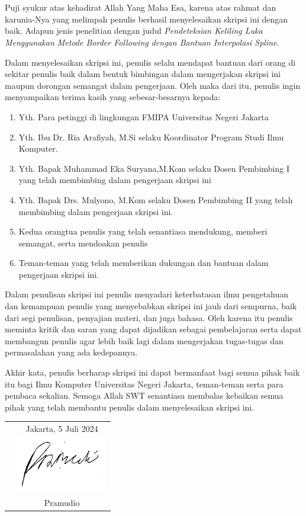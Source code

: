 \chapter*{}

Puji syukur atas kehadirat Allah Yang Maha Esa,
karena atas rahmat dan karunia-Nya yang melimpah 
penulis berhasil menyelesaikan 
skripsi ini dengan baik. Adapun jenis 
penelitian dengan judul 
\textit{Pendeteksian Keliling Luka Menggunakan Metode 
Border Following dengan Bantuan Interpolasi Spline}.

Dalam menyelesaikan skripsi ini, penulis selalu mendapat bantuan dari orang 
di sekitar penulis baik dalam bentuk bimbingan dalam mengerjakan skripsi 
ini maupun dorongan semangat dalam pengerjaan. Oleh maka dari itu, penulis 
ingin menyampaikan terima kasih yang sebesar-besarnya kepada:

\begin{enumerate}

	\item{Yth. Para petinggi di lingkungan FMIPA Universitas Negeri Jakarta}
	\item{Yth. Ibu Dr. Ria Arafiyah, M.Si selaku Koordinator Program Studi Ilmu
		Komputer.}
	\item{Yth. Bapak Muhammad Eka Suryana,M.Kom selaku Dosen Pembimbing I 
		yang telah membimbing dalam pengerjaan skripsi ini}
	\item{Yth. Bapak Drs. Mulyono, M.Kom selaku Dosen Pembimbing II yang telah
		membimbing dalam pengerjaan skripsi ini.}
	\item{Kedua orangtua penulis yang telah senantiasa mendukung,
	memberi semangat, serta mendoakan penulis}
	\item{Teman-teman yang telah memberikan dukungan dan bantuan dalam 
		pengerjaan skripsi ini.}
	
\end{enumerate}

Dalam penulisan skripsi ini penulis menyadari keterbatasan ilmu 
pengetahuan dan kemampuan penulis yang menyebabkan skripsi ini jauh dari 
sempurna, baik dari segi penulisan, penyajian materi, dan juga bahasa. Oleh 
karena itu penulis meminta kritik dan saran yang dapat dijadikan sebagai 
pembelajaran serta dapat membangun penulis agar lebih baik lagi dalam mengerjakan 
tugas-tugas dan permasalahan yang ada kedepannya.

Akhir kata, penulis berharap skripsi 
ini dapat bermanfaat bagi semua pihak baik itu 
bagi Ilmu Komputer Universitas Negeri Jakarta, teman-teman
serta para pembaca sekalian. Semoga Allah SWT 
senantiasa membalas kebaikan semua pihak yang 
telah membantu penulis dalam menyelesaikan skripsi ini.
\vspace{4cm}

\begin{tabular}{p{7.5cm}c}
	&Jakarta, 5 Juli 2024\\
	&\includegraphics[keepaspectratio, width = 4cm]{gambar/TTD_Pramudio.png}\\
	&Pramudio
\end{tabular}
